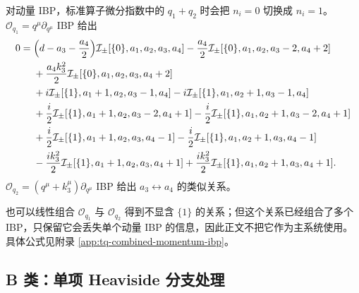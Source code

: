 ﻿\documentclass[a4paper,11pt]{article}
\begin{document}
对动量 IBP，标准算子微分指数中的 $q_1+q_2$ 时会把 $n_i=0$ 切换成 $n_i=1$。
$\mathcal{O}_{q_1}=q^\mu\partial_{q^\mu}$ IBP 给出
\begin{align}
    0={}&\Bigl(d-a_3-\frac{a_4}{2}\Bigr)\mathcal{I}_{\pm}[\{0\},a_1,a_2,a_3,a_4]
        -\frac{a_4}{2}\mathcal{I}_{\pm}[\{0\},a_1,a_2,a_3-2,a_4+2]\notag\\
    &+\frac{a_4 k_3^2}{2}\mathcal{I}_{\pm}[\{0\},a_1,a_2,a_3,a_4+2]\notag\\
    &+i\mathcal{I}_{\pm}[\{1\},a_1+1,a_2,a_3-1,a_4]
        -i\mathcal{I}_{\pm}[\{1\},a_1,a_2+1,a_3-1,a_4]\notag\\
    &+\frac{i}{2}\mathcal{I}_{\pm}[\{1\},a_1+1,a_2,a_3-2,a_4+1]
        -\frac{i}{2}\mathcal{I}_{\pm}[\{1\},a_1,a_2+1,a_3-2,a_4+1]\notag\\
    &+\frac{i}{2}\mathcal{I}_{\pm}[\{1\},a_1+1,a_2,a_3,a_4-1]
        -\frac{i}{2}\mathcal{I}_{\pm}[\{1\},a_1,a_2+1,a_3,a_4-1]\notag\\
    &-\frac{ik_3^2}{2}\mathcal{I}_{\pm}[\{1\},a_1+1,a_2,a_3,a_4+1]
        +\frac{ik_3^2}{2}\mathcal{I}_{\pm}[\{1\},a_1,a_2+1,a_3,a_4+1].
\end{align}
$\mathcal{O}_{q_2}=(q^\mu+k_3^\mu)\partial_{q^\mu}$ IBP 给出 $a_3\leftrightarrow a_4$ 的类似关系。

也可以线性组合 $\mathcal{O}_{q_1}$ 与 $\mathcal{O}_{q_2}$ 得到不显含 $\{1\}$ 的关系；但这个关系已经组合了多个 IBP，只保留它会丢失单个动量 IBP 的信息，因此正文不把它作为主系统使用。具体公式见附录 \ref{app:tq-combined-momentum-ibp}。

\subsection{B 类：单项 Heaviside 分支处理}
\end{document}
